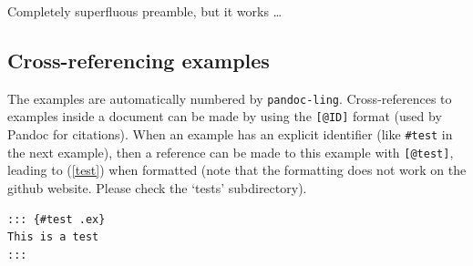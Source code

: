 \documentclass[
]{article}
\begin{document}
\begin{samepage}
\begin{exe} 
  \ex Completely superfluous preamble, but it works \ldots{}
  \begin{xlist}
  \end{xlist}
  \label{ex4.12}
\end{exe}
\end{samepage}

\hypertarget{cross-referencing-examples}{%
\subsection{Cross-referencing
examples}\label{cross-referencing-examples}}

The examples are automatically numbered by \texttt{pandoc-ling}.
Cross-references to examples inside a document can be made by using the
\texttt{{[}@ID{]}} format (used by Pandoc for citations). When an
example has an explicit identifier (like \texttt{\#test} in the next
example), then a reference can be made to this example with
\texttt{{[}@test{]}}, leading to (\ref{test}) when formatted (note that
the formatting does not work on the github website. Please check the
`tests' subdirectory).

\begin{verbatim}
::: {#test .ex}
This is a test
:::
\end{verbatim}

\begin{samepage}
\begin{exe} \judgewidth{}
  \label{test}
\end{exe}
\end{samepage}
\end{document}
